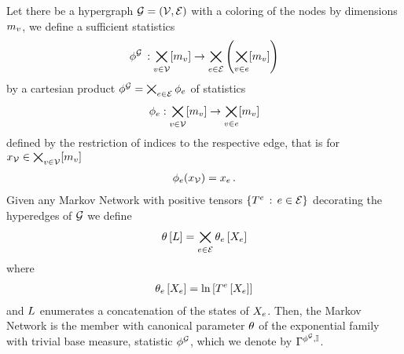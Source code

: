\begin{theorem}\label{the:markovNetworkExponentialFamilies}
    Let there be a hypergraph $\mathcal{G}=(\mathcal{V},\mathcal{E})$ with a coloring of the nodes by dimensions $m_{v}$, we define a sufficient statistics
    \begin{align*}
        \phi^{\mathcal{G}} \, : \bigtimes_{v\in\mathcal{V}} [m_{v}] \rightarrow \bigtimes_{e\in\mathcal{E}}\left(\bigtimes_{v\in e}[m_{v}]\right)
    \end{align*}
    by a cartesian product $\phi^{\mathcal{G}} = \bigtimes_{e\in\mathcal{E}} \phi_{e}$ of statistics
    \begin{align*}
        \phi_{e} : \bigtimes_{v\in\mathcal{V}} [m_{v}] \rightarrow \bigtimes_{v\in e} [m_{v}]
    \end{align*}
    defined by the restriction of indices to the respective edge, that is for $x_{\mathcal{V}}\in\bigtimes_{v\in\mathcal{V}}[m_{v}]$
    \begin{align*}
        \phi_{e}(x_{\mathcal{V}}) = x_{e} \, .
    \end{align*}
    Given any Markov Network with positive tensors $\{T^{e} \, : \, e\in\mathcal{E}\}$ decorating the hyperedges of $\mathcal{G}$ we define
    \begin{align*}
         \theta\left[L\right] = \bigtimes_{e\in\mathcal{E}} \theta_{e}\left[X_{e}\right]
    \end{align*}
    where
    \begin{align*}
        \theta_{e}\left[X_{e}\right] =  \ln \left[ T^{e}\left[X_{e}\right] \right]
    \end{align*}
    and $L$ enumerates a concatenation of the states of $X_{e}$.
    Then, the Markov Network is the member with canonical parameter $\theta$ of the exponential family with trivial base measure, statistic $\phi^{\mathcal{G}}$, which we denote by $\Gamma^{\phi^{\mathcal{G}},\mathbb{I}}$.
\end{theorem}
